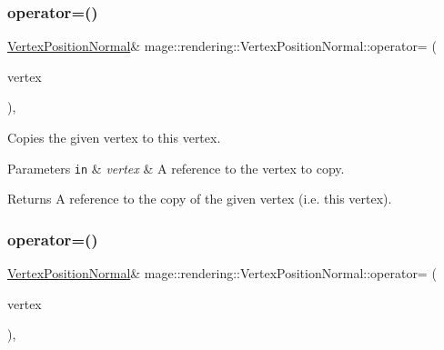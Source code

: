 \subsubsection{\texorpdfstring{operator=()}{operator=()}\hspace{0.1cm}{\footnotesize\ttfamily [1/2]}}
{\footnotesize\ttfamily \mbox{\hyperlink{structmage_1_1rendering_1_1_vertex_position_normal}{Vertex\+Position\+Normal}}\& mage\+::rendering\+::\+Vertex\+Position\+Normal\+::operator= (\begin{DoxyParamCaption}\item[{const \mbox{\hyperlink{structmage_1_1rendering_1_1_vertex_position_normal}{Vertex\+Position\+Normal}} \&}]{vertex }\end{DoxyParamCaption})\hspace{0.3cm}{\ttfamily [default]}, {\ttfamily [noexcept]}}

Copies the given vertex to this vertex.


\begin{DoxyParams}[1]{Parameters}
\mbox{\tt in}  & {\em vertex} & A reference to the vertex to copy. \\
\hline
\end{DoxyParams}
\begin{DoxyReturn}{Returns}
A reference to the copy of the given vertex (i.\+e. this vertex). 
\end{DoxyReturn}
\mbox{\label{structmage_1_1rendering_1_1_vertex_position_normal_aa46458a0fb21c67e2581c4e98deb6fc4}} 
\subsubsection{\texorpdfstring{operator=()}{operator=()}\hspace{0.1cm}{\footnotesize\ttfamily [2/2]}}
{\footnotesize\ttfamily \mbox{\hyperlink{structmage_1_1rendering_1_1_vertex_position_normal}{Vertex\+Position\+Normal}}\& mage\+::rendering\+::\+Vertex\+Position\+Normal\+::operator= (\begin{DoxyParamCaption}\item[{\mbox{\hyperlink{structmage_1_1rendering_1_1_vertex_position_normal}{Vertex\+Position\+Normal}} \&\&}]{vertex }\end{DoxyParamCaption})\hspace{0.3cm}{\ttfamily [default]}, {\ttfamily [noexcept]}}

